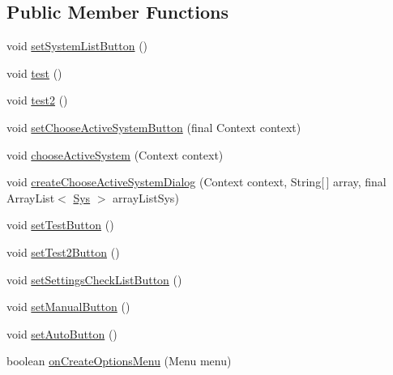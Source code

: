 \subsection*{Public Member Functions}
\begin{DoxyCompactItemize}
\item 
void \hyperlink{classpt_1_1lsts_1_1asa_1_1activities_1_1MainActivity_a486e4e30de1f1a65c72ddf27b27bc7fb}{set\+System\+List\+Button} ()
\item 
void \hyperlink{classpt_1_1lsts_1_1asa_1_1activities_1_1MainActivity_a1a1d1ddcf5eb19e909404ebc0809a732}{test} ()
\item 
void \hyperlink{classpt_1_1lsts_1_1asa_1_1activities_1_1MainActivity_a2266b419ecc85137e8c4fd77b30b69f5}{test2} ()
\item 
void \hyperlink{classpt_1_1lsts_1_1asa_1_1activities_1_1MainActivity_a851520f3c7fbee8362571a6c38c3263d}{set\+Choose\+Active\+System\+Button} (final Context context)
\item 
void \hyperlink{classpt_1_1lsts_1_1asa_1_1activities_1_1MainActivity_acc52da4726bd2b6b34c3e9e2c847169b}{choose\+Active\+System} (Context context)
\item 
void \hyperlink{classpt_1_1lsts_1_1asa_1_1activities_1_1MainActivity_a5c68fea76562d4870a67f4a9f47edb12}{create\+Choose\+Active\+System\+Dialog} (Context context, String\mbox{[}$\,$\mbox{]} array, final Array\+List$<$ \hyperlink{classpt_1_1lsts_1_1asa_1_1sys_1_1Sys}{Sys} $>$ array\+List\+Sys)
\item 
void \hyperlink{classpt_1_1lsts_1_1asa_1_1activities_1_1MainActivity_a5b24e3617c0a5d1c91d362904706668f}{set\+Test\+Button} ()
\item 
void \hyperlink{classpt_1_1lsts_1_1asa_1_1activities_1_1MainActivity_a4a8c1708cfde1dda2b56373237c27ca8}{set\+Test2\+Button} ()
\item 
void \hyperlink{classpt_1_1lsts_1_1asa_1_1activities_1_1MainActivity_a7996f5c81a6a009def3d996737aa9ee3}{set\+Settings\+Check\+List\+Button} ()
\item 
void \hyperlink{classpt_1_1lsts_1_1asa_1_1activities_1_1MainActivity_a42b5f540dfcbb80abd1693f740548590}{set\+Manual\+Button} ()
\item 
void \hyperlink{classpt_1_1lsts_1_1asa_1_1activities_1_1MainActivity_ac955e4b702781f521c042961e5e3a57d}{set\+Auto\+Button} ()
\item 
boolean \hyperlink{classpt_1_1lsts_1_1asa_1_1activities_1_1MainActivity_a07012b370283573865fd7ea14e2c92d9}{on\+Create\+Options\+Menu} (Menu menu)
\item 

\end{DoxyCompactItemize}
